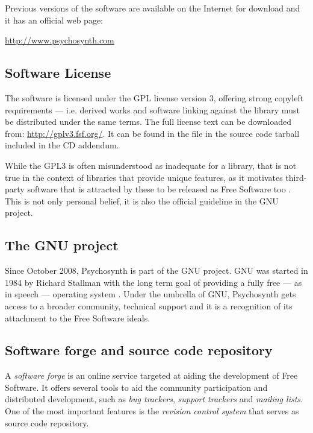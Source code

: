 Previous versions of the software are available on the Internet for
download and it has an official web page:

\url{http://www.psychosynth.com}

\subsection{Software License}

The software is licensed under the GPL license version 3, offering
strong copyleft requirements --- i.e. derived works and software
linking against the library must be distributed under the same
terms. The full license text can be downloaded from:
\url{http://gplv3.fsf.org/}. It can be found in the 
file in the source code tarball included in the CD addendum.

While the GPL3 is often misunderstood as
inadequate for a library, that is not true in the context of libraries
that provide unique features, as it motivates third-party software
that is attracted by these to be released as Free Software too
\cite{gnu99why}. This is not only personal belief, it is also the
official guideline in the GNU project.

\subsection{The GNU project}

Since October 2008, Psychosynth is part of the GNU
project. GNU was started in 1984 by Richard Stallman with the long
term goal of providing a fully free --- as in speech --- operating
system \cite{stallman2002free}. Under the umbrella of GNU, Psychosynth
gets access to a broader community, technical support and it is a
recognition of its attachment to the Free Software ideals.

\subsection{Software forge and source code repository}

A \emph{software forge} is an online service
targeted at aiding the development of Free Software. It offers several
tools to aid the community participation and distributed development,
such as \emph{bug trackers}, \emph{support
  trackers} and \emph{mailing lists}. One of
the most important features is the \emph{revision control
  system} that serves as source
code repository.

